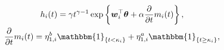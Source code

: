 \begin{gather}
  h_{i}(t) =
    \gamma t^{\gamma - 1} \exp\left\{
      \boldsymbol{w}_{i}^{\top}\boldsymbol{\theta} + \alpha \frac{\partial}{\partial t} m_{i}(t)
    \right\} \label{eqn:surv-submodel-def-one}, \\
  \frac{\partial}{\partial t} m_{i}(t) =
    \eta^{b}_{1, i} \mathbbm{1}_{\{t < \kappa_{i}\}} +
    \eta^{a}_{1, i} \mathbbm{1}_{\{t \geq \kappa_{i}\}}, \label{eqn:surv-submodel-def-two}
\end{gather}